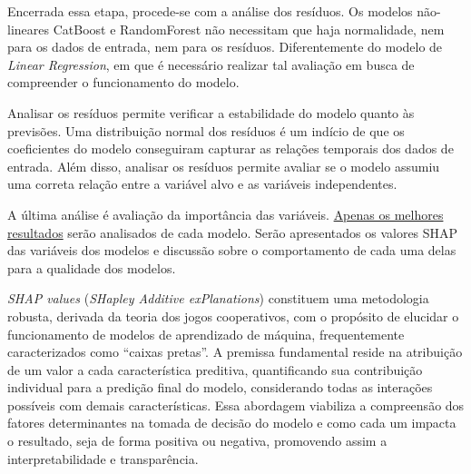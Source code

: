 
Encerrada essa etapa, procede-se com a análise dos resíduos. Os modelos não-lineares CatBoost e RandomForest não necessitam que haja normalidade, nem para os dados de entrada, nem para os resíduos. Diferentemente do modelo de \textit{Linear Regression}, em que é necessário realizar tal avaliação em busca de compreender o funcionamento do modelo.

Analisar os resíduos permite verificar a estabilidade do modelo quanto às previsões. Uma distribuição normal dos resíduos é um indício de que os coeficientes do modelo conseguiram capturar as relações temporais dos dados de entrada. Além disso, analisar os resíduos permite avaliar se o modelo assumiu uma correta relação entre a variável alvo e as variáveis independentes.\cite{belloto1985residual}


A última análise é avaliação da importância das variáveis. \underline{Apenas os melhores} \underline{resultados} serão analisados de cada modelo. Serão apresentados os valores SHAP das variáveis dos modelos e discussão sobre o comportamento de cada uma delas para a qualidade dos modelos.

\textit{SHAP values} (\textit{SHapley Additive exPlanations}) constituem uma metodologia robusta, derivada da teoria dos jogos cooperativos, com o propósito de elucidar o funcionamento de modelos de aprendizado de máquina, frequentemente caracterizados como ``caixas pretas''. A premissa fundamental reside na atribuição de um valor a cada característica preditiva, quantificando sua contribuição individual para a predição final do modelo, considerando todas as interações possíveis com demais características. Essa abordagem viabiliza a compreensão dos fatores determinantes na tomada de decisão do modelo e como cada um impacta o resultado, seja de forma positiva ou negativa, promovendo assim a interpretabilidade e transparência.\cite{merrick_taly_2020}

